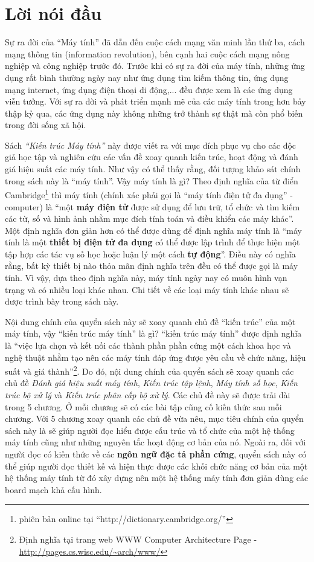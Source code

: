 \chapter{Lời nói đầu}

Sự ra đời của ``Máy tính'' đã dẫn đến cuộc cách mạng văn minh lần thứ ba, cách mạng thông tin (information revolution), bên cạnh hai cuộc cách mạng nông nghiệp và công nghiệp trước đó. Trước khi có sự ra đời của máy tính, những ứng dụng rất bình thường ngày nay như ứng dụng tìm kiếm thông tin, ứng dụng mạng internet, ứng dụng điện thoại di động,... đều được xem là các ứng dụng viễn tưởng. Với sự ra đời và phát triển mạnh mẽ của các máy tính trong hơn bảy thập kỷ qua, các ứng dụng này không những trở thành sự thật mà còn phổ biến trong đời sống xã hội.

Sách \emph{``Kiến trúc Máy tính''} này được viết ra với mục đích phục vụ cho các độc giả học tập và nghiên cứu các vấn đề xoay quanh kiến trúc, hoạt động và đánh giá hiệu suất các máy tính. Như vậy có thể thấy rằng, đối tượng khảo sát chính trong sách này là ``máy tính''. Vậy máy tính là gì? Theo định nghĩa của từ điển Cambridge\footnote{phiên bản online tại ``http://dictionary.cambridge.org/''} thì máy tính (chính xác phải gọi là ``máy tính điện tử đa dụng'' - computer) là ``một \textbf{máy điện tử} được sử dụng để lưu trữ, tổ chức và tìm kiếm các từ, số và hình ảnh nhằm mục đích tính toán và điều khiển các máy khác''. Một định nghĩa đơn giản hơn có thể được dùng để định nghĩa máy tính là ``máy tính là một \textbf{thiết bị điện tử đa dụng} có thể được lập trình để thực hiện một tập hợp các tác vụ số học hoặc luận lý một cách \textbf{tự động}''. Điều này có nghĩa rằng, bất kỳ thiết bị nào thỏa mãn định nghĩa trên đều có thể được gọi là máy tính. Vì vậy, dựa theo định nghĩa này, máy tính ngày nay có muôn hình vạn trạng và có nhiều loại khác nhau. Chi tiết về các loại máy tính khác nhau sẽ được trình bày trong sách này.

Nội dung chính của quyển sách này sẽ xoay quanh chủ đề ``kiến trúc'' của một máy tính, vậy ``kiến trúc máy tính'' là gì? ``kiến trúc máy tính'' được định nghĩa là ``việc lựa chọn và kết nối các thành phần phần cứng một cách khoa học và nghệ thuật nhằm tạo nên các máy tính đáp ứng được yêu cầu về chức năng, hiệu suất và giá thành''\footnote{Định nghĩa tại trang web WWW Computer Architecture Page - \url{http://pages.cs.wisc.edu/~arch/www/}}. Do đó, nội dung chính của quyển sách sẽ xoay quanh các chủ đề \emph{Đánh giá hiệu suất máy tính}, \emph{Kiến trúc tập lệnh}, \emph{Máy tính số học}, \emph{Kiến trúc bộ xử lý} và \emph{Kiến trúc phân cấp bộ xử lý}. Các chủ đề này sẽ được trải dài trong 5 chương. Ở mỗi chương sẽ có các bài tập cũng cố kiến thức sau mỗi chương. Với 5 chương xoay quanh các chủ đề vừa nêu, mục tiêu chính của quyển sách này là sẽ giúp người đọc hiểu được cấu trúc và tổ chức của một hệ thống máy tính cũng như những nguyên tắc hoạt động cơ bản của nó. Ngoài ra, đối với người đọc có kiến thức về các \textbf{ngôn ngữ đặc tả phần cứng}, quyển sách này có thể giúp người đọc thiết kế và hiện thực được các khối chức năng cơ bản của một hệ thống máy tính từ đó xây dựng nên một hệ thống máy tính đơn giản dùng các board mạch khả cấu hình.

